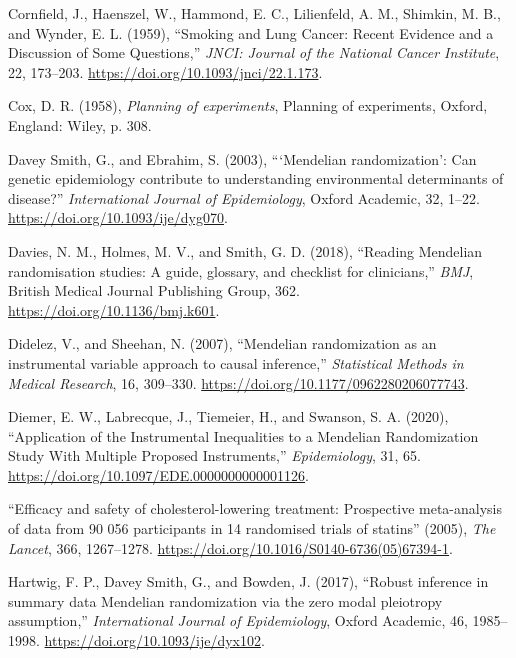 \documentclass[
]{article}
\theoremstyle{plain}
\begin{document}
\leavevmode\hypertarget{ref-cornfield_smoking_1959}{}%
Cornfield, J., Haenszel, W., Hammond, E. C., Lilienfeld, A. M., Shimkin, M. B., and Wynder, E. L. (1959), ``Smoking and Lung Cancer: Recent Evidence and a Discussion of Some Questions,'' \emph{JNCI: Journal of the National Cancer Institute}, 22, 173--203. \url{https://doi.org/10.1093/jnci/22.1.173}.

\leavevmode\hypertarget{ref-cox_planning_1958}{}%
Cox, D. R. (1958), \emph{Planning of experiments}, Planning of experiments, Oxford, England: Wiley, p. 308.

\leavevmode\hypertarget{ref-davey_smith_mendelian_2003}{}%
Davey Smith, G., and Ebrahim, S. (2003), ```Mendelian randomization': Can genetic epidemiology contribute to understanding environmental determinants of disease?'' \emph{International Journal of Epidemiology}, Oxford Academic, 32, 1--22. \url{https://doi.org/10.1093/ije/dyg070}.

\leavevmode\hypertarget{ref-davies_reading_2018}{}%
Davies, N. M., Holmes, M. V., and Smith, G. D. (2018), ``Reading Mendelian randomisation studies: A guide, glossary, and checklist for clinicians,'' \emph{BMJ}, British Medical Journal Publishing Group, 362. \url{https://doi.org/10.1136/bmj.k601}.

\leavevmode\hypertarget{ref-didelez_mendelian_2007}{}%
Didelez, V., and Sheehan, N. (2007), ``Mendelian randomization as an instrumental variable approach to causal inference,'' \emph{Statistical Methods in Medical Research}, 16, 309--330. \url{https://doi.org/10.1177/0962280206077743}.

\leavevmode\hypertarget{ref-diemer_application_2020}{}%
Diemer, E. W., Labrecque, J., Tiemeier, H., and Swanson, S. A. (2020), ``Application of the Instrumental Inequalities to a Mendelian Randomization Study With Multiple Proposed Instruments,'' \emph{Epidemiology}, 31, 65. \url{https://doi.org/10.1097/EDE.0000000000001126}.

\leavevmode\hypertarget{ref-20051267}{}%
``Efficacy and safety of cholesterol-lowering treatment: Prospective meta-analysis of data from 90 056 participants in 14 randomised trials of statins'' (2005), \emph{The Lancet}, 366, 1267--1278. \url{https://doi.org/10.1016/S0140-6736(05)67394-1}.

\leavevmode\hypertarget{ref-hartwig_robust_2017}{}%
Hartwig, F. P., Davey Smith, G., and Bowden, J. (2017), ``Robust inference in summary data Mendelian randomization via the zero modal pleiotropy assumption,'' \emph{International Journal of Epidemiology}, Oxford Academic, 46, 1985--1998. \url{https://doi.org/10.1093/ije/dyx102}.
\end{document}
